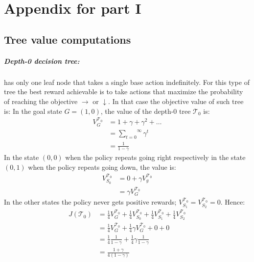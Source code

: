 \chapter{Appendix for part I}
\label{chap-app-pomdp}

\section{Tree value computations}\label{calcs}
\paragraph{Depth-0 decision tree:} has only one leaf node that takes a single base action indefinitely.
For this type of tree the best reward achievable is to take actions that maximize the probability of reaching the objective $\rightarrow$ or $\downarrow$. In that case the objective value of such tree is:
In the goal state $G = (1, 0)$, the value of the depth-0 tree $\mathcal{T}_0$ is:
\begin{align*}
    V^{\mathcal{T}_0}_G &= 1 + \gamma + \gamma^2 + \dots \\
    &= \overset{\infty}{\underset{t=0}\sum} \gamma^t \\
    &= \frac{1}{1 - \gamma}
\end{align*}
In the state $(0, 0)$ when the policy repeats going right respectively in the state $(0, 1)$ when the policy repeats going down, the value is:
\begin{align*}
    V^{\mathcal{T}_0}_{S_0} &= 0 + \gamma V^{\mathcal{T}_0}_g \\
    &= \gamma V^{\mathcal{T}_0}_G
\end{align*}
In the other states the policy never gets positive rewards; $V^{\mathcal{T}_0}_{S_1} = V^{\mathcal{T}_0}_{S_2} = 0$. Hence:
\begin{align*}
J(\mathcal{T}_0) &= \frac{1}{4} V^{\mathcal{T}_0}_G + \frac{1}{4} V^{\mathcal{T}_0}_{S_0}+ \frac{1}{4} V^{\mathcal{T}_0}_{S_1}+ \frac{1}{4} V^{\mathcal{T}_0}_{S_2} \\
&= \frac{1}{4} V^{\mathcal{T}_0}_G + \frac{1}{4} \gamma V^{\mathcal{T}_0}_G + 0 + 0\\
&= \frac{1}{4} \frac{1}{1 - \gamma} + \frac{1}{4} \gamma \frac{1}{1 - \gamma} \\
&= \frac{1 + \gamma}{4(1 - \gamma)}
\end{align*}

